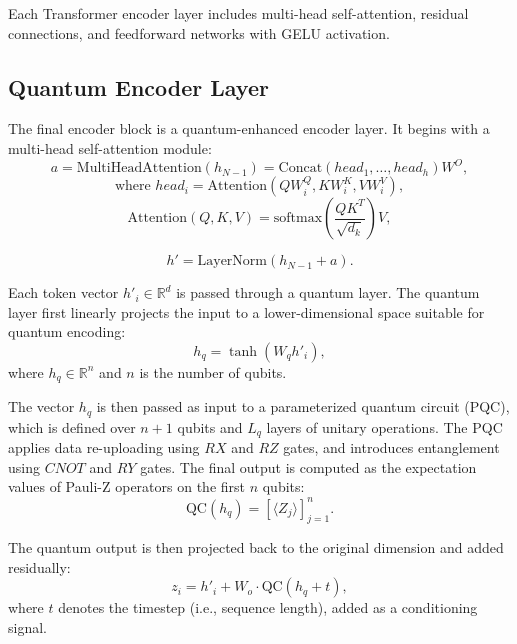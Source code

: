 \documentclass[conference]{IEEEtran}
\begin{document}
Each Transformer encoder layer includes multi-head self-attention, residual connections, and feedforward networks with GELU activation.

\subsection{Quantum Encoder Layer}

The final encoder block is a quantum-enhanced encoder layer. It begins with a multi-head self-attention module:
\begin{equation}
a = \text{MultiHeadAttention}(h_{N-1}) = \text{Concat}(head_1, \ldots, head_h)W^O,
\end{equation}
\begin{equation}
\text{where } head_i = \text{Attention}(QW_i^Q, KW_i^K, VW_i^V),
\end{equation}
\begin{equation}
\text{Attention}(Q, K, V) = \text{softmax}\left(\frac{QK^T}{\sqrt{d_k}}\right)V,
\end{equation}

\begin{equation}
h' = \text{LayerNorm}(h_{N-1} + a).
\end{equation}



Each token vector $h'_i \in \mathbb{R}^d$ is passed through a quantum layer. The quantum layer first linearly projects the input to a lower-dimensional space suitable for quantum encoding:
\begin{equation}
h_q = \tanh(W_q h'_i),
\end{equation}
where $h_q \in \mathbb{R}^{n}$ and $n$ is the number of qubits.

The vector $h_q$ is then passed as input to a parameterized quantum circuit (PQC), which is defined over $n + 1$ qubits and $L_q$ layers of unitary operations. The PQC applies data re-uploading using $RX$ and $RZ$ gates, and introduces entanglement using $CNOT$ and $RY$ gates. The final output is computed as the expectation values of Pauli-Z operators on the first $n$ qubits:
\begin{equation}
\text{QC}(h_q) = \left[ \langle Z_j \rangle \right]_{j=1}^{n}.
\end{equation}

The quantum output is then projected back to the original dimension and added residually:
\begin{equation}
z_i = h'_i + W_o \cdot \text{QC}(h_q + t),
\end{equation}
where $t$ denotes the timestep (i.e., sequence length), added as a conditioning signal.
\end{document}
